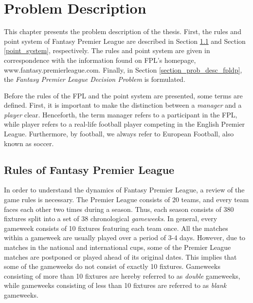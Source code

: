 
\chapter{Problem Description} \label{chapter_problem_description}

This chapter presents the problem description of the thesis. First, the rules and point system of Fantasy Premier League are described in Section \ref{rules of fpl} and Section \ref{point_system}, respectively. The rules and point system are given in correspondence with the information found on FPL's homepage, www.fantasy.premierleague.com. Finally, in Section \ref{section_prob_desc_fpldp}, the \textit{Fantasy Premier League Decision Problem} is formulated. 


\newpar

Before the rules of the FPL and the point system are presented, some terms are defined. First, it is important to make the distinction between a \textit{manager} and a \textit{player} clear. Henceforth, the term manager refers to a participant in the FPL, while player refers to a real-life football player competing in the English Premier League. Furthermore, by football, we always refer to European Football, also known as soccer.


\section{Rules of Fantasy Premier League} \label{rules of fpl}


In order to understand the dynamics of Fantasy Premier League, a review of the game rules is necessary. The Premier League consists of 20 teams, and every team faces each other two times during a season. Thus, each season consists of 380 fixtures split into a set of 38 chronological \textit{gameweeks}. In general, every gameweek consists of 10 fixtures featuring each team once. All the matches within a gameweek are usually played over a period of 3-4 days. However, due to matches in the national and international cups, some of the Premier League matches are postponed or played ahead of its original dates. This implies that some of the gameweeks do not consist of exactly 10 fixtures. Gameweeks consisting of more than 10 fixtures are hereby referred to as \textit{double} gameweeks, while gameweeks consisting of less than 10 fixtures are referred to as \textit{blank} gameweeks.


